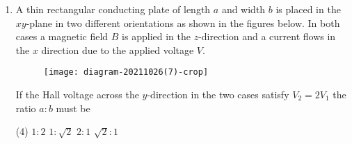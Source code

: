 \begin{enumerate}
	(In the following $B$ is the constant)
	{}
\begin{tasks}(2)
\task[\textbf{A.}] Proportional to $\cos \left(B-\frac{e E}{\hbar} a t\right)$
\task[\textbf{B.}] Proportional to $E$
\task[\textbf{C.}] Independent of $E$
\task[\textbf{D.}] Proportional to $\sin \left(B-\frac{e E}{\hbar}\right.$ at $)$
\end{tasks}
\begin{answer}
\begin{align*}
\intertext{In the presence of electric field E , we can write}
\vec{F}&=-e \vec{E} \Rightarrow \frac{d \vec{p}}{d t}=-e \vec{E} \Rightarrow \hbar \frac{d k}{d t}=-e E\\
\text{Integration gives, }k(t)&=k(0)-\frac{e E}{\hbar} t\\
\text{The group velocity }v&=\frac{d \omega}{d k}=\frac{1}{\hbar} \frac{\partial \varepsilon(k)}{d k}\\
\text{	Since, }\varepsilon(k)&=\mu-\gamma \cos (k a), \qquad \therefore \quad \frac{\partial \varepsilon(k)}{\partial k}=\gamma a \sin k a\\
\text{Thus, }v&=\frac{\gamma a}{\hbar} \sin (k a)
\intertext{Time dependent velocity of electron is}
v(t)&=\frac{\gamma a}{\hbar} \sin [k(t) a]=\frac{\gamma a}{\hbar} \sin \left[\left(k(0)-\frac{e E}{\hbar} t\right) a\right]\\
&=\frac{\gamma a}{\hbar} \sin \left[k(0) a-\frac{e E}{\hbar} a t\right] \Rightarrow v(t)=\frac{\gamma a}{\hbar} \sin \left[B-\frac{e E}{\hbar} a t\right]
\end{align*}
So the correct answer is \textbf{Option (D)}
\end{answer}
	\item  A thin rectangular conducting plate of length $a$ and width $b$ is placed in the $x y$-plane in two different orientations as shown in the figures below. In both cases a magnetic field $B$ is applied in the $z$-direction and a current flows in the $x$ direction due to the applied voltage $V$.\\
	\begin{figure}[H]
		\centering
		\texttt{[image: diagram-20211026(7)-crop]}
	\end{figure}
	If the Hall voltage across the $y$-direction in the two cases satisfy $V_{2}=2 V_{1}$ the ratio $a: b$ must be
	{}
\begin{tasks}(4)
\task[\textbf{A.}]  $1: 2$
\task[\textbf{B.}] $1: \sqrt{2}$
\task[\textbf{C.}] $2: 1$
\task[\textbf{D.}] $\sqrt{2}: 1$

\end{tasks}
\end{enumerate}
